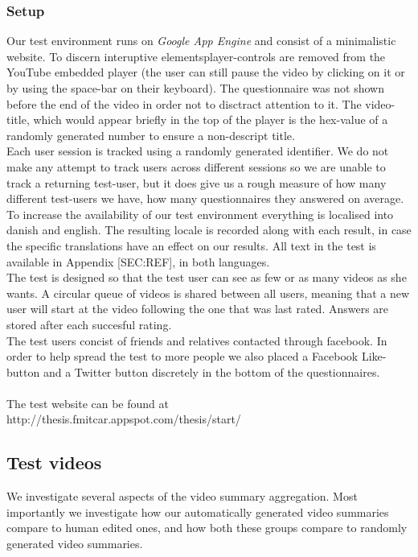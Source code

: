 \subsubsection{Setup}
%
Our test environment runs on \textit{Google App Engine} and consist of a minimalistic website. To discern interuptive elementsplayer-controls are removed from the YouTube embedded player (the user can still pause the video by clicking on it or by using the space-bar on their keyboard). The questionnaire was not shown before the end of the video in order not to disctract attention to it. The video-title, which would appear briefly in the top of the player is the hex-value of a randomly generated number to ensure a non-descript title.\\
Each user session is tracked using a randomly generated identifier. We do not make any attempt to track users across different sessions so we are unable to track a returning test-user, but it does give us a rough measure of how many different test-users we have, how many questionnaires they answered on average.\\
To increase the availability of our test environment everything is localised into danish and english. The resulting locale is recorded along with each result, in case the specific translations have an effect on our results. All text in the test is available in Appendix [SEC:REF], in both languages.\\
The test is designed so that the test user can see as few or as many videos as she wants. A circular queue of videos is shared between all users, meaning that a new user will start at the video following the one that was last rated. Answers are stored after each succesful rating.\\
The test users concist of friends and relatives contacted through facebook. In order to help spread the test to more people we also placed a Facebook Like-button and a Twitter button discretely in the bottom of the questionnaires.\\\\
%
The test website can be found at\\
http://thesis.fmitcar.appspot.com/thesis/start/\\

%
\subsection{Test videos}
%
We investigate several aspects of the video summary aggregation. Most importantly we investigate how our automatically generated video summaries compare to human edited ones, and how both these groups compare to randomly generated video summaries.
